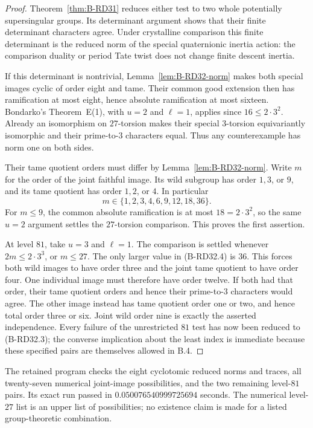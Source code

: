 \begin{proof}
Theorem~\ref{thm:B-RD31} reduces either test to two whole
potentially supersingular groups. Its determinant argument
shows that their finite determinant characters agree.
Under crystalline comparison this finite determinant is
the reduced norm of the special quaternionic inertia
action: the comparison duality or period Tate twist does
not change finite descent inertia.

If this determinant is nontrivial, Lemma~\ref{lem:B-RD32-norm}
makes both special images cyclic of order eight and tame.
Their common good extension then has ramification at most
eight, hence absolute ramification at most sixteen.
Bondarko's Theorem~E(1), with $u=2$ and $\ell=1$, applies
since $16\leq2\cdot3^2$. Already an isomorphism on
$27$-torsion makes their special $3$-torsion equivariantly
isomorphic and their prime-to-$3$ characters equal.
Thus any counterexample has norm one on both sides.

Their tame quotient orders must differ by
Lemma~\ref{lem:B-RD32-norm}. Write $m$ for the order of
the joint faithful image. Its wild subgroup has order
$1,3$, or $9$, and its tame quotient has order $1,2$, or
$4$. In particular
\[
                m\in\{1,2,3,4,6,9,12,18,36\}.
                                                        \tag{B-RD32.4}
\]
For $m\leq9$, the common absolute ramification is at most
$18=2\cdot3^2$, so the same $u=2$ argument settles the
$27$-torsion comparison. This proves the first assertion.

At level $81$, take $u=3$ and $\ell=1$. The comparison is
settled whenever $2m\leq2\cdot3^3$, or $m\leq27$.
The only larger value in (B-RD32.4) is $36$. This forces
both wild images to have order three and the joint tame
quotient to have order four. One individual image must
therefore have order twelve. If both had that order,
their tame quotient orders and hence their prime-to-$3$
characters would agree. The other image instead has
tame quotient order one or two, and hence total order
three or six. Joint wild order nine is exactly the
asserted independence. Every failure of the unrestricted
$81$ test has now been reduced to (B-RD32.3); the converse
implication about the least index is immediate because
these specified pairs are themselves allowed in B.4.
\end{proof}

\begin{remark}
The retained program
checks the eight cyclotomic reduced norms and traces, all twenty-seven
numerical joint-image possibilities, and the two remaining level-$81$
pairs. Its exact run passed in $0.050076540999725694$ seconds.
The numerical level-$27$ list is an upper list of possibilities; no
existence claim is made for a listed group-theoretic combination.
\end{remark}
